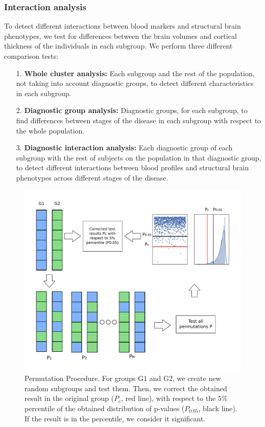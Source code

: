 \subsubsection{Interaction analysis}

To detect different interactions between blood markers and structural brain phenotypes, we test for differences between the brain volumes and cortical thickness of the individuals in each subgroup. We perform three different comparison tests:

\begin{itemize}
\item[1.] \textbf{Whole cluster analysis:} Each subgroup and the rest of the population, not taking into account diagnostic groups, to detect different characteristics in each subgroup.
\item[2.] \textbf{ Diagnostic group analysis:} Diagnostic groups, for each subgroup, to find differences between stages of the disease in each subgroup with respect to the whole population. %
\item[3.] \textbf{Diagnostic interaction analysis:} Each diagnostic group of each subgroup with the rest of subjects on the population in that diagnostic group, to detect different interactions between blood profiles and structural brain phenotypes across different stages of the disease.
\end{itemize}

\begin{figure}[!htbp]
\centering
\includegraphics[width=1.0\textwidth]{figures/cimlr/figure_2.pdf}
    \caption[Permutation procedure.]{Permutation Procedure. For groups G1 and G2, we create new random subgroups and test them. Then, we correct the obtained result in the original group ($P_c$, red line), with respect to the $5\%$ percentile of the obtained distribution of p-values ($P_{0.05}$, black line). If the result is in the percentile, we consider it significant.}
    \label{fig:permutation}
\end{figure}

